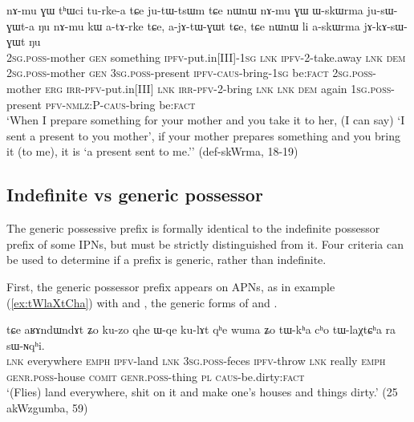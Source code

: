 \begin{exe}
\ex \label{ex:askWrma}
\gll nɤ-mu ɣɯ tʰɯci tu-rke-a tɕe ju-tɯ-tsɯm tɕe nɯnɯ nɤ-mu ɣɯ ɯ-skɯrma ju-sɯ-ɣɯt-a ŋu nɤ-mu kɯ a-tɤ-rke tɕe, a-jɤ-tɯ-ɣɯt tɕe, tɕe nɯnɯ li a-skɯrma jɤ-kɤ-sɯ-ɣɯt ŋu \\
\textsc{2sg}.\textsc{poss}-mother \textsc{gen} something \textsc{ipfv}-put.in[III]-\textsc{1sg} \textsc{lnk} \textsc{ipfv}-2-take.away \textsc{lnk} \textsc{dem} \textsc{2sg}.\textsc{poss}-mother \textsc{gen} \textsc{3sg}.\textsc{poss}-present  \textsc{ipfv}-\textsc{caus}-bring-\textsc{1sg} be:\textsc{fact} \textsc{2sg}.\textsc{poss}-mother  \textsc{erg} \textsc{irr}-\textsc{pfv}-put.in[III] \textsc{lnk} \textsc{irr}-\textsc{pfv}-2-bring \textsc{lnk} \textsc{lnk} \textsc{dem} again \textsc{1sg}.\textsc{poss}-present \textsc{pfv}-\textsc{nmlz}:P-\textsc{caus}-bring be:\textsc{fact} \\
\glt `When I prepare something for your mother and you take it to her, (I can say) `I sent a present to you mother', if your mother prepares something and you bring it (to me), it is `a present sent to me.'' (def-skWrma, 18-19)
\end{exe}
 
\subsection{Indefinite vs generic possessor} \label{sec:indef.genr.poss}
The generic possessive prefix  is formally identical to the indefinite possessor prefix of some IPNs, but must be strictly distinguished from it. Four criteria can be used to determine if a  prefix is generic, rather than indefinite.

First, the generic possessor prefix appears on APNs, as in example (\ref{ex:tWlaXtCha}) with  and , the generic forms of  and .

\begin{exe}
\ex \label{ex:tWlaXtCha}
\gll tɕe  	aʁɤndɯndɤt  	ʑo  	ku-zo  	qhe  	ɯ-qe  	ku-lɤt  	qʰe	wuma  ʑo  	tɯ-kʰa  	cʰo  	tɯ-laχtɕʰa  	ra  	sɯ-ɴqʰi.  \\
\textsc{lnk} everywhere \textsc{emph} \textsc{ipfv}-land \textsc{lnk} \textsc{3sg.poss}-feces \textsc{ipfv}-throw \textsc{lnk} really \textsc{emph} \textsc{genr.poss}-house \textsc{comit} \textsc{genr.poss}-thing \textsc{pl} \textsc{caus}-be.dirty:\textsc{fact} \\
\glt `(Flies) land everywhere, shit on it and make one's houses and things dirty.' (25 akWzgumba, 59)
\end{exe}

